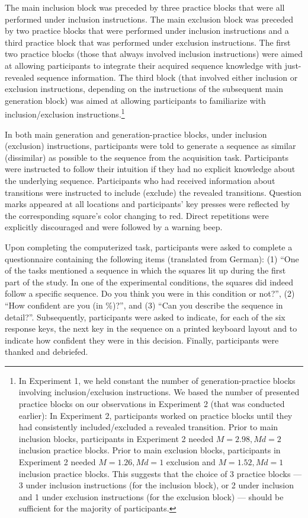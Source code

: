 \documentclass[man]{apa6}
\theoremstyle{definition}
\theoremstyle{definition}
\theoremstyle{definition}
\theoremstyle{remark}
\begin{document}
The main inclusion block was preceded by three practice blocks that were
all performed under inclusion instructions. The main exclusion block was
preceded by two practice blocks that were performed under inclusion
instructions and a third practice block that was performed under
exclusion instructions. The first two practice blocks (those that always
involved inclusion instructions) were aimed at allowing participants to
integrate their acquired sequence knowledge with just-revealed sequence
information. The third block (that involved either inclusion or
exclusion instructions, depending on the instructions of the subsequent
main generation block) was aimed at allowing participants to familiarize
with inclusion/exclusion instructions.\footnote{In Experiment 1, we held
  constant the number of generation-practice blocks involving
  inclusion/exclusion instructions. We based the number of presented
  practice blocks on our observations in Experiment 2 (that was
  conducted earlier): In Experiment 2, participants worked on practice
  blocks until they had consistently included/excluded a revealed
  transition. Prior to main inclusion blocks, participants in Experiment
  2 needed \(M = 2.98, \mathit{Md} = 2\) inclusion practice blocks.
  Prior to main exclusion blocks, participants in Experiment 2 needed
  \(M = 1.26, \mathit{Md} = 1\) exclusion and
  \(M = 1.52, \mathit{Md} = 1\) inclusion practice blocks. This suggests
  that the choice of 3 practice blocks --- 3 under inclusion
  instructions (for the inclusion block), or 2 under inclusion and 1
  under exclusion instructions (for the exclusion block) --- should be
  sufficient for the majority of participants.}

In both main generation and generation-practice blocks, under inclusion
(exclusion) instructions, participants were told to generate a sequence
as similar (dissimilar) as possible to the sequence from the acquisition
task. Participants were instructed to follow their intuition if they had
no explicit knowledge about the underlying sequence. Participants who
had received information about transitions were instructed to include
(exclude) the revealed transitions. Question marks appeared at all
locations and participants' key presses were reflected by the
corresponding square's color changing to red. Direct repetitions were
explicitly discouraged and were followed by a warning beep.

Upon completing the computerized task, participants were asked to
complete a questionnaire containing the following items (translated from
German): (1) \enquote{One of the tasks mentioned a sequence in which the
squares lit up during the first part of the study. In one of the
experimental conditions, the squares did indeed follow a specific
sequence. Do you think you were in this condition or not?}, (2)
\enquote{How confident are you (in \%)?}, and (3) \enquote{Can you
describe the sequence in detail?}. Subsequently, participants were asked
to indicate, for each of the six response keys, the next key in the
sequence on a printed keyboard layout and to indicate how confident they
were in this decision. Finally, participants were thanked and debriefed.
\end{document}
